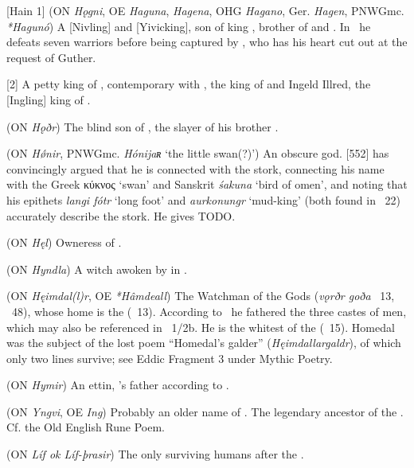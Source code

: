 \begin{itemize}
[Hain 1] (ON \emph{Hǫgni}, OE \emph{Haguna}, \emph{Hagena}, OHG \emph{Hagano}, Ger. \emph{Hagen}, PNWGmc. \emph{*Hagunó})
  A [Nivling] and [Yivicking], son of king , brother of  and . In \Atlakvida\ he defeats seven warriors before being captured by , who has his heart cut out at the request of Guther.

[2]
  A petty king of , contemporary with , the king of  and Ingeld Illred, the [Ingling] king of .

 (ON \emph{Hǫðr})
  The blind son of , the slayer of his brother .

 (ON \emph{Hǿnir}, PNWGmc. \emph{Hónijaʀ} ‘the little swan(?)’)
  An obscure god. \textcite{Rydberg1886}[552] has convincingly argued that he is connected with the stork, connecting his name with the Greek \textgreek{κύκνος} ‘swan’ and Sanskrit \emph{śakuna} ‘bird of omen’, and noting that his epithets \emph{langi fótr} ‘long foot’ and \emph{aurkonungr} ‘mud-king’ (both found in \Skaldskaparmal\ 22) accurately describe the stork. He gives  TODO.

 (ON \emph{Hęl})
  Owneress of .

 (ON \emph{Hyndla})
  A witch awoken by  in \Hyndluljod.

 (ON \emph{Hęimdal(l)r}, OE \emph{*Hâmdeall})
  The Watchman of the Gods (\emph{vǫrðr goða} \Grimnismal\ 13, \Lokasenna\ 48), whose home is the  (\Grimnismal\ 13).  According to \Rigsthula\ he fathered the three castes of men, which may also be referenced in \Voluspa\ 1/2b.  He is the whitest of the  (\Thrymskvida\ 15).  Homedal was the subject of the lost poem “Homedal’s galder” (\emph{Hęimdallargaldr}), of which only two lines survive; see Eddic Fragment 3 under Mythic Poetry.

 (ON \emph{Hymir})
  An ettin, ’s father according to \Hymiskvida.

 (ON \emph{Yngvi}, OE \emph{Ing})
  Probably an older name of . The legendary ancestor of the . Cf. the Old English Rune Poem.

 (ON \emph{Líf ok Líf-þrasir})
  The only surviving humans after the .


\end{itemize}
